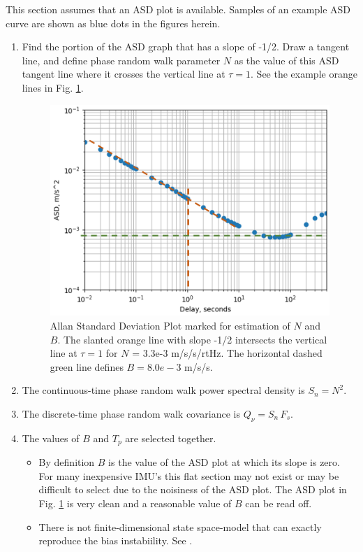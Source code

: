\documentclass[letter,twocolumn]{article}
\begin{document}
This section assumes that an ASD plot is available. 
Samples of an example ASD curve are shown as blue dots in the figures herein.
\begin{enumerate}
	\item Find the portion of the ASD graph that has a slope of -1/2. Draw a tangent line, and define phase random walk parameter $N$ as the value of this ASD tangent line where it crosses the vertical line at $\tau = 1$. See the example orange lines in Fig. \ref{fig:ASD_plot_N_B}.
	
	\begin{figure}[htb]
		\centering
		\includegraphics[trim=0in 0in 0in 0.1in, clip, width=0.8\columnwidth]{figure/ASD_plot_N_B}
		\caption{Allan Standard Deviation Plot marked for estimation of $N$ and $B$. 
			The slanted orange line with slope -1/2 intersects the vertical line at $\tau=1$ for $N$ = 3.3e-3 m/s/s/rtHz. The horizontal dashed green line defines $B=8.0 e-3$ m/s/s. }
		\label{fig:ASD_plot_N_B}
	\end{figure}
	
	\item The continuous-time phase random walk power spectral density is \blue $S_n=N^2$. \black
	\item The discrete-time phase random walk covariance is \blue $Q_\nu = S_n \, F_s$. \black
	\item The values of $B$ and $T_p$ are selected together. 
	\begin{itemize}
		\item 	By definition $B$ is the value of the ASD plot at which its slope is zero. For many inexpensive IMU's this flat section may not exist or may be difficult to select due to the noisiness of the ASD plot. 
		The ASD plot in Fig. \ref{fig:ASD_plot_N_B} is very clean and a reasonable value of $B$ can be read off. 
		\item There is not finite-dimensional state space-model that can exactly reproduce the bias instabiility. See \cite{CSM_IMU}.
		

\end{itemize}
\end{enumerate}
\end{document}
